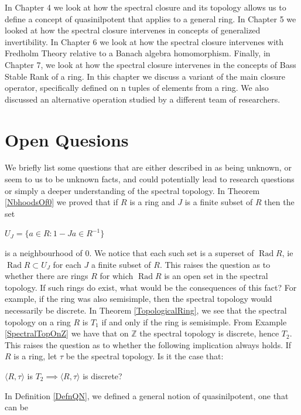 \documentclass[12pt, oneside]{book}
\def\Rad{\operatorname{Rad}}
\begin{document}
\vskip 0.3cm
\noindent In Chapter 4 we look at how the spectral closure and its topology allows us to define a concept 
of quasinilpotent that applies to a general ring.
\vskip 0.3cm
\noindent In Chapter 5 we looked at how the spectral closure intervenes in concepts of generalized
 invertibility.
\vskip 0.3cm
\noindent In Chapter 6 we look at how the spectral closure intervenes with Fredholm Theory relative to 
a Banach algebra homomorphism.
\vskip 0.3cm
\noindent Finally, in Chapter 7, we look at how the spectral closure intervenes in the concepts of 
Bass Stable Rank of a ring. In this chapter we discuss a variant of the main closure operator,
specifically defined on n tuples of elements from a ring. We also discussed an alternative operation
studied by a different team of researchers. 
\section{Open Quesions}
We briefly list some questions that are either described in \cite{CH3} as being unknown, or seem to us 
to be unknown facts, and could potentially lead to research questions or simply a deeper understanding 
of the spectral topology.
\vskip 0.3cm
\noindent In Theorem \ref{NbhoodsOf0} we proved that if $R$ is a ring and $J$ is a finite subset of $R$
then the set
\begin{center}
$U_J = \{a \in R : 1 - Ja \in R^{-1} \}$
\end{center}
is a neighbourhood of 0. We notice that each such set is a superset of $\Rad R$, 
ie $\Rad R \subset U_J$ for each $J$ a finite subset of $R$. This raises the question as to whether 
there are rings $R$ for which $\Rad R$ is an open set in the spectral topology. 
If such rings do exist, what would be the consequences of this fact? For example, if the ring was also 
semisimple, then the spectral topology would necessarily be discrete.
\vskip 0.3cm
\noindent In Theorem \ref{TopologicalRing}, we see that the spectral topology on a ring $R$ is $T_1$ 
if and only if the ring is semisimple. From Example \ref{SpectralTopOnZ} we have that on $\mathbb{Z}$
the spectral topology is discrete, hence $T_2$. This raises the question as to whether the following 
implication always holds. If $R$ is a ring, let $\tau$ be the spectral topology. Is it the case that:
\begin{center}
$\langle R, \tau \rangle$ is $T_2 \implies \langle R, \tau \rangle$ is discrete?
\end{center}
\vskip 0.3cm
\noindent In Definition \ref{DefnQN}, we defined a general notion of quasinilpotent, one that can be 
\end{document}
